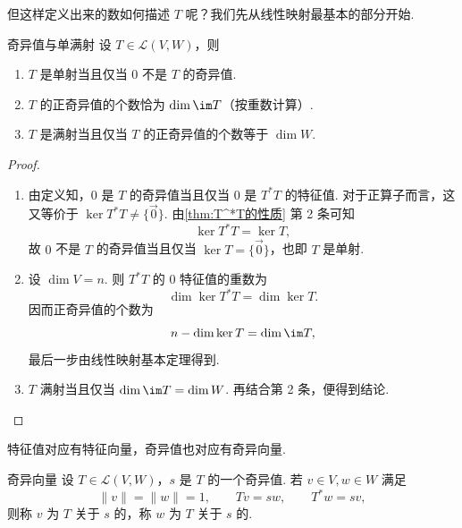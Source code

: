 但这样定义出来的数如何描述 $ T $ 呢？我们先从线性映射最基本的部分开始.

\begin{theorem}{}{奇异值与单满射}
    设 $ T \in \mathcal{L}(V, W) $，则
    \begin{enumerate}
        \item $ T $ 是单射当且仅当 $ 0 $ 不是 $ T $ 的奇异值.

        \item $ T $ 的正奇异值的个数恰为 $ \dim \im T $（按重数计算）.

        \item $ T $ 是满射当且仅当 $ T $ 的正奇异值的个数等于 $ \dim W $.
    \end{enumerate}
\end{theorem}

\begin{proof}
    \begin{enumerate}
        \item 由定义知，$ 0 $ 是 $ T $ 的奇异值当且仅当 $ 0 $ 是 $ T^*T $ 的特征值. 对于正算子而言，这又等价于 $ \ker T^*T \neq \{\vec{0}\} $. 由\autoref{thm:T^*T的性质} 第 2 条可知
              \[
                  \ker T^*T = \ker T,
              \]
              故 $ 0 $ 不是 $ T $ 的奇异值当且仅当 $ \ker T = \{\vec{0}\} $，也即 $ T $ 是单射.

        \item 设 $ \dim V = n $. 则 $ T^*T $ 的 $ 0 $ 特征值的重数为
              \[
                  \dim \ker T^*T = \dim \ker T.
              \]
              因而正奇异值的个数为
              \[
                  n - \dim \ker T = \dim \im T,
              \]
              最后一步由线性映射基本定理得到.

        \item $ T $ 满射当且仅当 $ \dim \im T = \dim W $. 再结合第 2 条，便得到结论.
    \end{enumerate}
\end{proof}

特征值对应有特征向量，奇异值也对应有奇异向量.

\begin{definition}{奇异向量}{} 
    设 $ T \in \mathcal{L}(V, W) $，$ s $ 是 $ T $ 的一个奇异值. 若 $ v \in V, w \in W $ 满足
    \[
        \lVert v \rVert = \lVert w \rVert = 1,\qquad Tv = sw,\qquad T^*w = sv,
    \]
    则称 $ v $ 为 $ T $ 关于 $ s $ 的，称 $ w $ 为 $ T $ 关于 $ s $ 的.
\end{definition}

